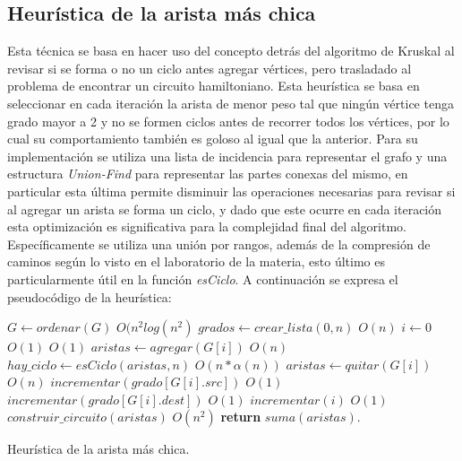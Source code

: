 \documentclass[10pt,a4paper]{article}
\begin{document}
\subsection{Heurística de la arista más chica} \label{sec:hamc}

Esta técnica se basa en hacer uso del concepto detrás del algoritmo de Kruskal al revisar si se forma o no un ciclo  antes agregar vértices, pero trasladado al problema de encontrar un circuito hamiltoniano. Esta heurística se basa en seleccionar en cada iteración la arista de menor peso tal que ningún vértice tenga grado mayor a 2 y no se formen ciclos antes de recorrer todos los vértices, por lo cual su comportamiento también es goloso al igual que la anterior. Para su implementación se utiliza una lista de incidencia para representar el grafo y una estructura \emph{Union-Find} para representar las partes conexas del mismo, en particular esta última permite disminuir las operaciones necesarias para revisar si al agregar un arista se forma un ciclo, y dado que este ocurre en cada iteración esta optimización es significativa para la complejidad final del algoritmo. Específicamente se utiliza una unión por rangos, además de la compresión de caminos según lo visto en el laboratorio de la materia, esto último es particularmente útil en la función \emph{esCiclo}. A continuación se expresa el pseudocódigo de la heurística:

\begin{algorithm}
	\begin{algorithmic}[1]
		\State $G \leftarrow ordenar(G)$ \Comment $O(n^2log(n^2)$
		\State $grados \leftarrow crear\_lista(0,n)$  \Comment $O(n)$
		\State $i \leftarrow 0$  \Comment $O(1)$
             \Comment $O(1)$     
                \State $aristas \leftarrow agregar(G[i])$ \Comment $O(n)$ 
		        \State $hay\_ciclo \leftarrow esCiclo(aristas, n)$ \Comment $O(n* \alpha(n))$
		        \State $aristas \leftarrow quitar(G[i])$ \Comment $O(n)$
		    \Else
		        \State $incrementar(grado[G[i].src])$ \Comment $O(1)$
                \State $incrementar(grado[G[i].dest])$ \Comment $O(1)$
            \EndIf
            \EndIf
		\State $incrementar(i)$ \Comment $O(1)$
		\EndWhile
		\State $construir\_circuito(aristas)$ \Comment $O(n^2)$
		\State \textbf{return} $suma(aristas)$.
		\EndFunction
	\end{algorithmic}
	\caption{Heurística de la arista más chica.}
	\label{alg:hamc}
\end{algorithm}
\end{document}
